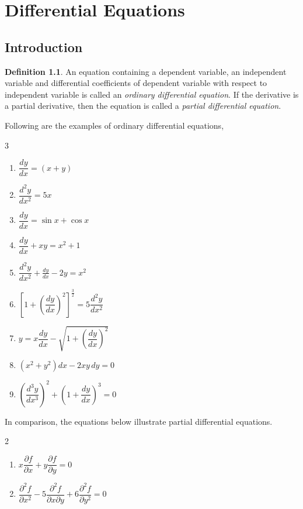 \documentclass{book}
\theoremstyle{definition}
\newtheorem{definition}{Definition}[section]
\begin{document}
\chapter{Differential Equations}

\section{Introduction}

\begin{definition}
An equation containing a dependent variable, an independent variable and differential coefficients of dependent variable with respect to independent variable is called an \textit{ordinary differential equation}. If the derivative is a partial derivative, then the equation is called a \textit{partial differential equation}.
\end{definition}

Following are the examples of ordinary differential equations,
\begin{multicols}{3}
\begin{enumerate}[label=(\roman*)]
    \item $\dfrac{dy}{dx}=(x+y)$
    \item $\dfrac{d^2y}{dx^2}=5x$
    \item $\dfrac{dy}{dx}=\sin x+\cos x$
    \item $\dfrac{dy}{dx}+xy=x^2+1$
    \item $\dfrac{d^2y}{dx^2}+\frac{dy}{dx}-2y=x^2$
    \item $[1+(\dfrac{dy}{dx})^2]^{\frac{3}{2}}=5\dfrac{d^2y}{dx^2}$
    \item $y=x\dfrac{dy}{dx}-\sqrt{1+(\dfrac{dy}{dx})^2}$
    \item $(x^2+y^2)dx-2xy\,dy=0$
    \item $(\dfrac{d^3y}{dx^3})^2+(1+\dfrac{dy}{dx})^3=0$
\end{enumerate}
\end{multicols}
In comparison, the equations below illustrate partial differential equations.
\begin{multicols}{2}
\begin{enumerate}[label=(\roman*)]
    \item $x\dfrac{\partial f}{\partial x}+y\dfrac{\partial f}{\partial y}=0$
    \item $\dfrac{\partial^2f}{\partial x^2}-5\dfrac{\partial^2f}{\partial x\partial y}+6\dfrac{\partial^2f}{\partial y^2}=0$
\end{enumerate}
\end{multicols}
\end{document}
